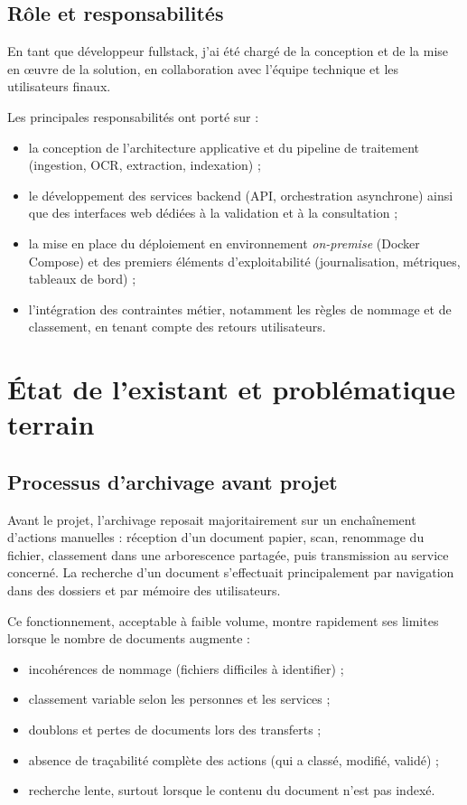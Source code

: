 \documentclass[12pt,a4paper]{report}
\begin{document}
\section{Rôle et responsabilités}
En tant que développeur fullstack, j’ai été chargé de la conception et de la mise en œuvre de la solution, en collaboration avec l’équipe technique et les utilisateurs finaux.

Les principales responsabilités ont porté sur :
\begin{itemize}
  \item la conception de l’architecture applicative et du pipeline de traitement (ingestion, OCR, extraction, indexation) ;
  \item le développement des services backend (API, orchestration asynchrone) ainsi que des interfaces web dédiées à la validation et à la consultation ;
  \item la mise en place du déploiement en environnement \textit{on-premise} (Docker Compose) et des premiers éléments d’exploitabilité (journalisation, métriques, tableaux de bord) ;
  \item l’intégration des contraintes métier, notamment les règles de nommage et de classement, en tenant compte des retours utilisateurs.
\end{itemize}

\chapter{État de l’existant et problématique terrain}
\section{Processus d’archivage avant projet}
Avant le projet, l’archivage reposait majoritairement sur un enchaînement d’actions manuelles : réception d’un document papier, scan, renommage du fichier, classement dans une arborescence partagée, puis transmission au service concerné. La recherche d’un document s’effectuait principalement par navigation dans des dossiers et par mémoire des utilisateurs.

Ce fonctionnement, acceptable à faible volume, montre rapidement ses limites lorsque le nombre de documents augmente :
\begin{itemize}
  \item incohérences de nommage (fichiers difficiles à identifier) ;
  \item classement variable selon les personnes et les services ;
  \item doublons et pertes de documents lors des transferts ;
  \item absence de traçabilité complète des actions (qui a classé, modifié, validé) ;
  \item recherche lente, surtout lorsque le contenu du document n’est pas indexé.
\end{itemize}
\end{document}
